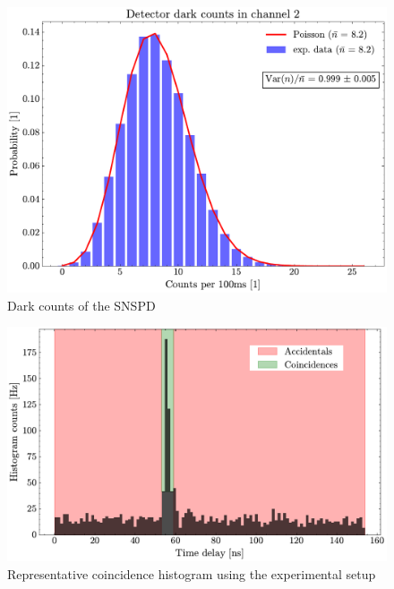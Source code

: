 \begin{figure}[h!]
\begin{minipage}{0.33\textwidth}
		\includegraphics[page=3,width=\linewidth]{Images/DC_chAll.pdf}
	\end{minipage}
	\caption{Dark counts of the SNSPD}
	\label{fig:DC}
\end{figure}

\begin{figure}[tb!]
	\centering
	\includegraphics[width=.7\textwidth]{Images/HistogramExample.pdf}
	\caption{Representative coincidence histogram using the experimental setup}
	\label{fig:HistExamAcc}
\end{figure}